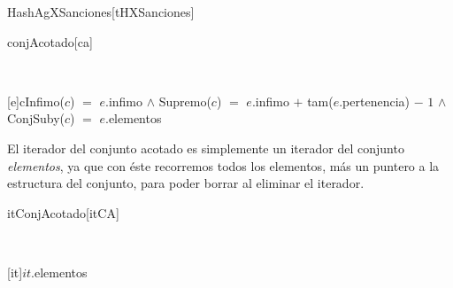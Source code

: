 \begin{Representacion}

  \begin{Estructura}{HashAgXSanciones}[tHXSanciones]
    \begin{Tupla}[tHXSanciones]%
    
    \end{Tupla} 

  \end{Estructura}

	\begin{Estructura}{conjAcotado}[ca]
		\begin{Tupla}[ca]%
			\tupItem{}{}
			\tupItem{}{}
		\end{Tupla}
	\end{Estructura}

  \mbox{}

  ~

  [e]{c}{Infimo($c$) $=$ $e$.infimo $\land$ Supremo($c$) $=$ $e$.infimo $+$ tam($e$.pertenencia) $-$ $1$ $\land$\\ ConjSuby($c$) $=$ $e$.elementos}



  El iterador del conjunto acotado es simplemente un iterador del conjunto \textit{elementos}, ya que con éste recorremos todos los elementos, más un puntero a la estructura del conjunto, para poder borrar al eliminar el iterador.  

  \begin{Estructura}{itConjAcotado}[itCA]
    \begin{Tupla}[itCA]%
    \end{Tupla}
  \end{Estructura}


  ~

  [it]{$it$.elementos}


\end{Representacion}

